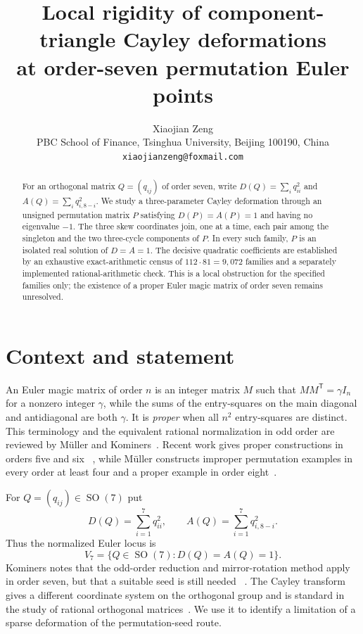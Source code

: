 \documentclass[11pt]{article}
\title{Local rigidity of component-triangle Cayley deformations\\
at order-seven permutation Euler points}
\author{Xiaojian Zeng\\
\small PBC School of Finance, Tsinghua University, Beijing 100190, China\\
\small \texttt{xiaojianzeng@foxmail.com}}
\date{}
\newcommand{\SO}{\operatorname{SO}}
\begin{document}
\maketitle

\begin{abstract}
For an orthogonal matrix $Q=(q_{ij})$ of order seven, write
$D(Q)=\sum_i q_{ii}^2$ and $A(Q)=\sum_i q_{i,8-i}^2$.
We study a three-parameter Cayley deformation through an unsigned
permutation matrix $P$ satisfying $D(P)=A(P)=1$ and having no eigenvalue
$-1$.  The three skew coordinates join, one at a time, each pair among the
singleton and the two three-cycle components of $P$.  In every such family,
$P$ is an isolated real solution of $D=A=1$.  The decisive quadratic
coefficients are established by an exhaustive exact-arithmetic census of
$112\cdot81=9{,}072$ families and a separately implemented rational-arithmetic
check.  This is a local obstruction for the specified families only; the
existence of a proper Euler magic matrix of order seven remains unresolved.
\end{abstract}

\section{Context and statement}

An Euler magic matrix of order $n$ is an integer matrix $M$ such that
$MM^{\mathsf T}=\gamma I_n$ for a nonzero integer $\gamma$, while the sums
of the entry-squares on the main diagonal and antidiagonal are both
$\gamma$.  It is \emph{proper} when all $n^2$ entry-squares are distinct.
This terminology and the equivalent rational normalization in odd order are
reviewed by M\"uller and Kominers~\cite{Muller2026,Kominers2026}.  Recent
work gives proper constructions in orders five and six
~\cite{Kominers2026,Mehat2026}, while M\"uller constructs improper
permutation examples in every order at least four and a proper example in
order eight~\cite{Muller2026}.

For $Q=(q_{ij})\in\SO(7)$ put
\[
 D(Q)=\sum_{i=1}^7q_{ii}^2,
 \qquad
 A(Q)=\sum_{i=1}^7q_{i,8-i}^2.
\]
Thus the normalized Euler locus is
\[
 V_7=\{Q\in\SO(7):D(Q)=A(Q)=1\}.
\]
Kominers notes that the odd-order reduction and mirror-rotation method apply
in order seven, but that a suitable seed is still needed
~\cite[Section~5]{Kominers2026}.  The Cayley transform gives a different
coordinate system on the orthogonal group and is standard in the study of
rational orthogonal matrices~\cite{LiebeckOsborne1991,Muller2026}.  We use it
to identify a limitation of a sparse deformation of the permutation-seed
route.
\end{document}
